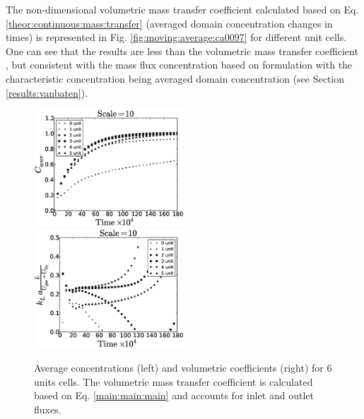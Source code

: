 \documentclass{article}
\begin{document}
The non-dimensional volumetric mass transfer coefficient calculated based on Eq.
\ref{theor:continuous:mass:transfer} (averaged domain concentration changes in times) is
represented in Fig. \ref{fig:moving:average:ca0097} for different unit cells. One can see that the
results are less than the volumetric mass transfer coefficient , but consistent with the mass flux
concentration based on \citeauthor{vanbaten-circular} formulation with the characteristic
concentration being averaged domain concentration (see Section \ref{results:vanbaten}).
\begin{figure}[htb!]
\includegraphics[width=0.5\textwidth]{Figures/aver_units6scale10.eps}\hfill
\includegraphics[width=0.5\textwidth]{Figures/right_def_6scale10.eps}\\
\caption{Average concentrations (left) and volumetric coefficients (right) for $6$ units cells. The
volumetric
mass transfer coefficient is calculated based on Eq. \ref{main:main:main} and accounts for inlet
and outlet fluxes. \label{fig:unit:6}}
\end{figure}
\end{document}
